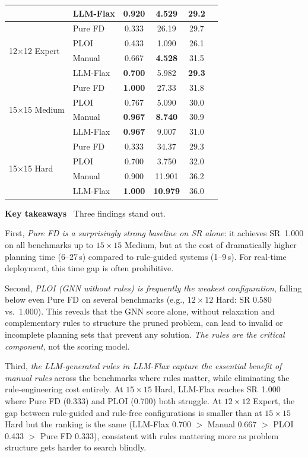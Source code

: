 \documentclass[letterpaper, 10pt, journal, twoside]{IEEEtran}
\newcommand{\myparagraph}[1]{\noindent\textbf{#1}~}
\newcommand{\method}{LLM-Flax\xspace}
\begin{document}
\begin{table}[t]
{\begin{tabular}{llcccc}
      & \method      & \textbf{0.920} & 4.529 & 29.2 \\
    \midrule
    \multirow{4}{*}{12$\times$12 Expert}
      & Pure FD      & 0.333 & 26.19 & 29.7 \\
      & PLOI         & 0.433 & 1.090 & 26.1 \\
      & Manual       & 0.667 & \textbf{4.528} & 31.5 \\
      & \method      & \textbf{0.700} & 5.982 & \textbf{29.3} \\
    \midrule
    \multirow{4}{*}{15$\times$15 Medium}
      & Pure FD      & \textbf{1.000} & 27.33 & 31.8 \\
      & PLOI         & 0.767 & 5.090 & 30.0 \\
      & Manual       & \textbf{0.967} & \textbf{8.740} & 30.9 \\
      & \method      & \textbf{0.967} & 9.007 & 31.0 \\
    \midrule
    \multirow{4}{*}{15$\times$15 Hard}
      & Pure FD      & 0.333 & 34.37 & 29.3 \\
      & PLOI         & 0.700 & 3.750 & 32.0 \\
      & Manual       & 0.900 & 11.901 & 36.2 \\
      & \method      & \textbf{1.000} & \textbf{10.979} & 36.0 \\
    \bottomrule
  \end{tabular}%
  }
\end{table}

\myparagraph{Key takeaways}
Three findings stand out.

First, \emph{Pure FD is a surprisingly strong baseline on SR alone}: it achieves SR~1.000 on all benchmarks up to $15{\times}15$ Medium, but at the cost of dramatically higher planning time (6--27\,s) compared to rule-guided systems (1--9\,s).
For real-time deployment, this time gap is often prohibitive.

Second, \emph{PLOI (GNN without rules) is frequently the weakest configuration}, falling below even Pure FD on several benchmarks (e.g., $12{\times}12$ Hard: SR 0.580 vs.\ 1.000).
This reveals that the GNN score alone, without relaxation and complementary rules to structure the pruned problem, can lead to invalid or incomplete planning sets that prevent any solution.
\emph{The rules are the critical component}, not the scoring model.

Third, \emph{the LLM-generated rules in \method capture the essential benefit of manual rules} across the benchmarks where rules matter, while eliminating the rule-engineering cost entirely.
At $15{\times}15$ Hard, \method reaches SR~1.000 where Pure FD (0.333) and PLOI (0.700) both struggle.
At $12{\times}12$ Expert, the gap between rule-guided and rule-free configurations is smaller than at $15{\times}15$ Hard but the ranking is the same (\method 0.700 $>$ Manual 0.667 $>$ PLOI 0.433 $>$ Pure FD 0.333), consistent with rules mattering more as problem structure gets harder to search blindly.
\end{document}
